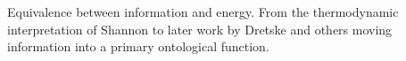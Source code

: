 Equivalence between information and energy. From the thermodynamic interpretation of Shannon to later work by Dretske and others moving information into a primary ontological function.